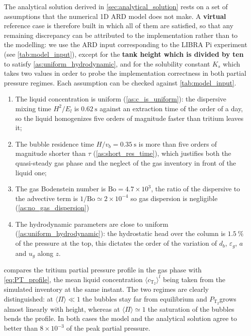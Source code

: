 \documentclass[a4paper,11pt,oneside]{report}
\newcommand{\PT}{\ensuremath{P_\mathrm{T_2}}}
\newcommand{\CT}{\ensuremath{c_\mathrm{T_2}}}
\newcounter{assumption}[chapter]
\begin{document}
The analytical solution derived in \cref{sec:analytical_solution} rests on a set of assumptions that the numerical 1D ARD model does not make. A \textbf{virtual} reference case is therefore built in which all of them are satisfied, so that any remaining discrepancy can be attributed to the implementation rather than to the modelling: we use the ARD input corresponding to the LIBRA Pi experiment (see \cref{tab:model_input}), except for the \textbf{tank height which is divided by ten} to satisfy \cref{as:uniform_hydrodynamic}, and for the solubility constant $K_s$ which takes two values in order to probe the implementation correctness in both partial pressure regimes. Each assumption can be checked against \cref{tab:model_input}.
\begin{enumerate}
    \item The liquid concentration is uniform (\cref{as:c_is_uniform}): the dispersive mixing time $H^2/E_l$ is $0.62\ \mathrm{s}$ against an extraction time of the order of a day, so the liquid homogenizes five orders of magnitude faster than tritium leaves it;
    \item The bubble residence time $H/v_b=0.35\ \mathrm{s}$ is more than five orders of magnitude shorter than $\tau$ (\cref{as:short_res_time}), which justifies both the quasi-steady gas phase and the neglect of the gas inventory in front of the liquid one;
    \item The gas Bodenstein number is $\mathrm{Bo}=4.7\times10^{3}$, the ratio of the dispersive to the advective term is $1/\mathrm{Bo}\simeq2\times10^{-4}$ so gas dispersion is negligible (\cref{as:no_gas_dispersion})
    \item The hydrodynamic parameters are close to uniform (\cref{as:uniform_hydrodynamic}): the hydrostatic head over the column is $1.5\ \%$ of the pressure at the top, this dictates the order of the variation of $d_b$, $\varepsilon_g$, $a$ and $u_g$ along $z$.
\end{enumerate}

 compares the tritium partial pressure profile in the gas phase with \cref{eq:PT_profile}, the mean liquid concentration $\langle\CT\rangle^l$ being taken from the simulated inventory at the same instant. The two regimes are clearly distinguished: at $\langle\Pi\rangle\ll1$ the bubbles stay far from equilibrium and \PT grows almost linearly with height, whereas at $\langle\Pi\rangle\simeq1$ the saturation of the bubbles bends the profile. In both cases the model and the analytical solution agree to better than $8\times10^{-3}$ of the peak partial pressure.
\end{document}
